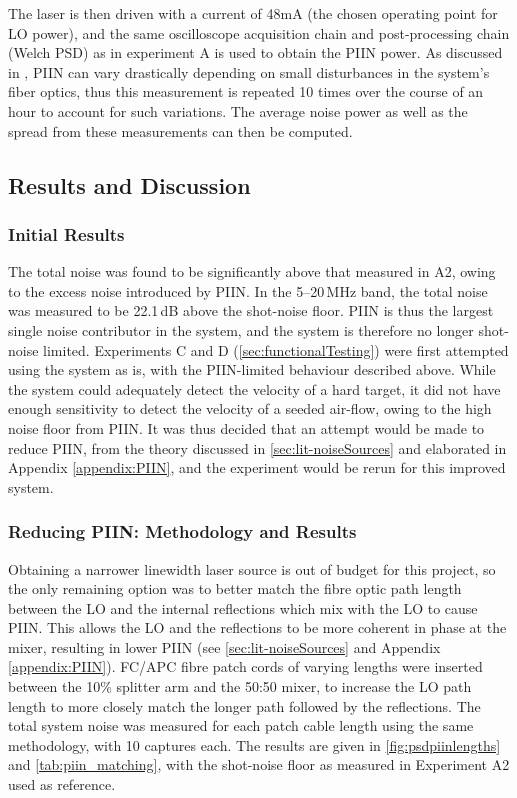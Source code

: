  The laser is then driven with a current of 48mA (the chosen operating point for LO power), and the same oscilloscope acquisition chain and post-processing chain (Welch PSD) as in experiment A is used to obtain the PIIN power. As discussed in \cite{harris_role_1998}, PIIN can vary drastically depending on small disturbances in the system's fiber optics, thus this measurement is repeated 10 times over the course of an hour to account for such variations. The average noise power as well as the spread from these measurements can then be computed. 
 

\subsection{Results and Discussion}

\subsubsection{Initial Results}
The total noise was found to be significantly above that measured in A2, owing to the excess noise introduced by PIIN. In the 5--20\,MHz band, the total noise was measured to be 22.1\,dB above the shot-noise floor. PIIN is thus the largest single noise contributor in the system, and the system is therefore no longer shot-noise limited. Experiments C and D (\autoref{sec:functionalTesting}) were first attempted using the system as is, with the PIIN-limited behaviour described above. While the system could adequately detect the velocity of a hard target, it did not have enough sensitivity to detect the velocity of a seeded air-flow, owing to the high noise floor from PIIN. It was thus decided that an attempt would be made to reduce PIIN, from the theory discussed in \autoref{sec:lit-noiseSources} and elaborated in Appendix \ref{appendix:PIIN}, and the experiment would be rerun for this improved system. 

\subsubsection{Reducing PIIN: Methodology and Results}
\label{sec:reducing_piin}
 Obtaining a narrower linewidth laser source is out of budget for this project, so the only remaining option was to better match the fibre optic path length between the LO and the internal reflections which mix with the LO to cause PIIN. This allows the LO and the reflections to be more coherent in phase at the mixer, resulting in lower PIIN (see \autoref{sec:lit-noiseSources} and Appendix \ref{appendix:PIIN}). FC/APC fibre patch cords of varying lengths were inserted between the 10\% splitter arm and the 50:50 mixer, to increase the LO path length to more closely match the longer path followed by the reflections. The total system noise was measured for each patch cable length using the same methodology, with 10 captures each. The results are given in \autoref{fig:psdpiinlengths} and \autoref{tab:piin_matching}, with the shot-noise floor as measured in Experiment A2 used as reference. 

